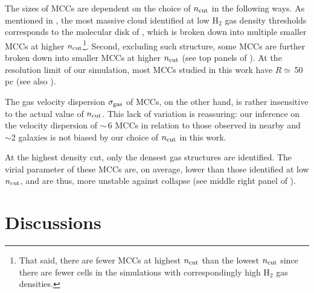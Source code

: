 \IfFileExists{emulateapjlegacy.cls}{\documentclass[iop]{emulateapjlegacy}}{\documentclass[iop]{emulateapj}}
\begin{document}
The sizes of MCCs are dependent on the choice of $n_{\rm cut}$ in the following ways.
As mentioned in , the most massive cloud identified at low H$_2$ gas density thresholds
corresponds to the molecular disk of \flower, which is broken down into multiple smaller MCCs at higher 
$n_{\rm cut}$\footnote{That said, there are fewer MCCs at highest $n_{\rm cut}$ than the lowest $n_{\rm cut}$ 
 since there are fewer cells in the simulations with correspondingly high H$_2$ gas densities.}.
Second, excluding such structure, some MCCs are further broken down into smaller MCCs at higher $n_{\rm cut}$ 
(see top panels of ). 
At the resolution limit of our simulation, most MCCs studied in this work have $R\simeq$\,50\,pc (see also ).
%

%
The gas velocity dispersion $\sigma_{\rm gas}$ of MCCs, on the other hand, is rather insensitive to the actual value of $n_{\rm cut}$.
This lack of variation is reassuring: our inference on the velocity dispersion of \z$\sim$\,6 MCCs in relation to those observed in
nearby and \z$\sim$2 galaxies is not biased by our choice of $n_{\rm cut}$ in this work.

At the highest density cut, only the densest gas structures are identified.
The virial parameter of these MCCs are, on average, lower than those identified at low $n_{\rm cut}$, and are thus, more 
unstable against collapse (see middle right panel of ).  


\section{Discussions}\label{sec:diss}
\end{document}
